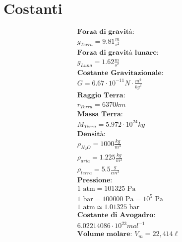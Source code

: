\section{Costanti}

\begin{gather*}
    \textbf{Forza di gravità: } \\ g_{Terra} = 9.81 \frac{m}{s^2} \\
    \textbf{Forza di gravità lunare: } \\ g_{Luna} = 1.62 \frac{m}{s^2} \\
    \textbf{Costante Gravitazionale: } \\
    G = 6.67 \cdot 10^{-11} N \cdot \frac{m^2}{kg^2} \\
    \textbf{Raggio Terra: } \\ r_{Terra} = 6370 km \\
    \textbf{Massa Terra: } \\ M_{Terra} = 5.972 \cdot 10^{24} kg \\
    \textbf{Densità: } \\
    \rho_{H_2O} = 1000 \frac{kg}{m^3} \\
    \rho_{aria} = 1.225 \frac{kg}{m^3} \\
    \rho_{terra} = 5.5 \frac{g}{cm^3} \\
    \textbf{Pressione: } \\
    1 \text{ atm} = 101 325 \text{ Pa} \\
    1 \text{ bar} = 100 000 \text{ Pa} = 10^5 \text{ Pa} \\
    1 \text{ atm} \simeq 1.01325 \text{ bar} \\
    \textbf{Costante di Avogadro: } \\
    6.02214086 \cdot 10^{23} mol^{-1} \\
    \textbf{Volume molare: } V_m = 22,414 \ell
\end{gather*}